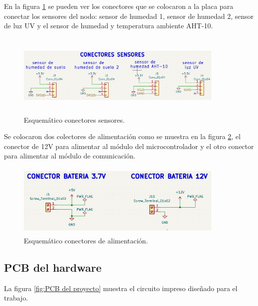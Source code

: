 En la figura \ref{fig:esquematico conectores sensores} se pueden ver los conectores que se colocaron a la placa para conectar los sensores del nodo: sensor de humedad 1, sensor de humedad 2, sensor de luz UV y el sensor de humedad y temperatura ambiente AHT-10.
\begin{figure}[h!]
  \centering
	\includegraphics[width=10cm, height=4cm]{./Figures/conectores_sensores.png}
	\caption{Esquemático conectores sensores.}
	\label{fig:esquematico conectores sensores}
\end{figure}
Se colocaron dos colectores de alimentación como se muestra en la figura \ref{fig:esquematico conectores alimentacion}, el conector de 12V para alimentar al módulo del microcontrolador y el otro conector para alimentar al módulo de comunicación.
\begin{figure}[h!]
  \centering
	\includegraphics[width=10cm, height=3.5cm]{./Figures/esquematico_alimentacion.png}
	\caption{Esquemático conectores de alimentación.}
	\label{fig:esquematico conectores alimentacion}
\end{figure}

\subsection{PCB del hardware} 
La figura \ref{fig:PCB del proyecto} muestra el circuito impreso diseñado para el trabajo.

